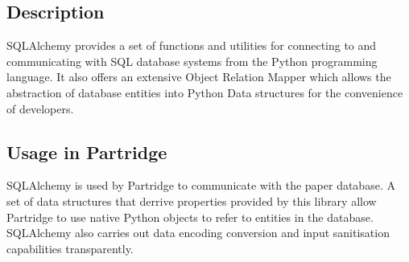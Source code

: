 \subsection{Description}
SQLAlchemy provides a set of functions and utilities for connecting to and
communicating with SQL database systems from the Python programming language.
It also offers an extensive Object Relation Mapper which allows the abstraction
of database entities into Python Data structures for the convenience of
developers.

\subsection{Usage in Partridge}

SQLAlchemy is used by Partridge to communicate with the paper database. A set
of data structures that derrive properties provided by this library allow
Partridge to use native Python objects to refer to entities in the database.
SQLAlchemy also carries out data encoding conversion and input sanitisation
capabilities transparently.
